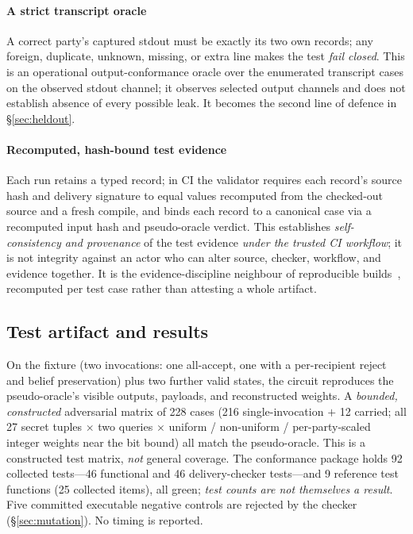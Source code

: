 \documentclass[conference]{IEEEtran}
\begin{document}
\paragraph{A strict transcript oracle}
A correct party's captured stdout must be exactly its two own records; any foreign,
duplicate, unknown, missing, or extra line makes the test \emph{fail closed}. This is an
operational output-conformance oracle over the enumerated transcript cases on the
observed stdout channel; it observes selected output channels and does not establish
absence of every possible leak. It becomes the second line of defence in
\S\ref{sec:heldout}.

\paragraph{Recomputed, hash-bound test evidence}
Each run retains a typed record; in CI the validator requires each record's source hash
and delivery signature to equal values recomputed from the checked-out source and a fresh
compile, and binds each record to a canonical case via a recomputed input hash and
pseudo-oracle verdict. This establishes \emph{self-consistency and provenance} of the test
evidence \emph{under the trusted CI workflow}; it is not integrity against an actor who
can alter source, checker, workflow, and evidence together. It is the evidence-discipline
neighbour of reproducible builds~\cite{reprobuilds}, recomputed per test case rather than
attesting a whole artifact.

\subsection{Test artifact and results}
\label{sec:results}
On the fixture (two invocations: one all-accept, one with a per-recipient reject and
belief preservation) plus two further valid states, the circuit reproduces the
pseudo-oracle's visible outputs, payloads, and reconstructed weights. A \emph{bounded,
constructed} adversarial matrix of 228 cases (216 single-invocation $+$ 12 carried; all 27
secret tuples $\times$ two queries $\times$ uniform / non-uniform / per-party-scaled
integer weights near the bit bound) all match the pseudo-oracle. This is a constructed
test matrix, \emph{not} general coverage. The conformance package holds 92 collected
tests---46 functional and 46 delivery-checker tests---and 9 reference test functions (25
collected items), all green; \emph{test counts are not themselves a result}. Five
committed executable negative controls are rejected by the checker (\S\ref{sec:mutation}).
No timing is reported.
\end{document}
